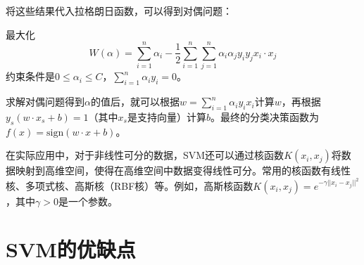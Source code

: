 \documentclass[12pt]{article}
\begin{document}
将这些结果代入拉格朗日函数，可以得到对偶问题：

最大化
\[
W(\alpha)=\sum_{i = 1}^{n}\alpha_i-\frac{1}{2}\sum_{i = 1}^{n}\sum_{j = 1}^{n}\alpha_i\alpha_jy_iy_jx_i\cdot x_j
\]
约束条件是\(0\leq\alpha_i\leq C\)，\(\sum_{i = 1}^{n}\alpha_iy_i = 0\)。

求解对偶问题得到\(\alpha\)的值后，就可以根据\(w=\sum_{i = 1}^{n}\alpha_iy_ix_i\)计算\(w\)，再根据\(y_s(w\cdot x_s + b)=1\)（其中\(x_s\)是支持向量）计算\(b\)。最终的分类决策函数为\(f(x)=\text{sign}(w\cdot x + b)\)。

在实际应用中，对于非线性可分的数据，SVM还可以通过核函数\(K(x_i,x_j)\)将数据映射到高维空间，使得在高维空间中数据变得线性可分。常用的核函数有线性核、多项式核、高斯核（RBF核）等。例如，高斯核函数\(K(x_i,x_j)=e^{-\gamma\vert\vert x_i - x_j\vert\vert^2}\)，其中\(\gamma>0\)是一个参数。


\section{SVM的优缺点}
\end{document}

